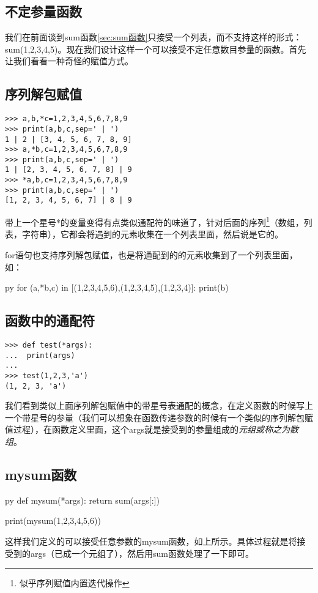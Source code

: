 \documentclass[12pt,oneside]{book}
\begin{document}
\begin{common-format}
\section{不定参量函数}
我们在前面谈到sum函数\ref{sec:sum函数}只接受一个列表，而不支持这样的形式：sum(1,2,3,4,5)。现在我们设计这样一个可以接受不定任意数目参量的函数。首先让我们看看一种奇怪的赋值方式。

\subsection{序列解包赋值}
\label{sec:序列解包赋值}
\begin{Verbatim}
>>> a,b,*c=1,2,3,4,5,6,7,8,9
>>> print(a,b,c,sep=' | ')
1 | 2 | [3, 4, 5, 6, 7, 8, 9]
>>> a,*b,c=1,2,3,4,5,6,7,8,9
>>> print(a,b,c,sep=' | ')
1 | [2, 3, 4, 5, 6, 7, 8] | 9
>>> *a,b,c=1,2,3,4,5,6,7,8,9
>>> print(a,b,c,sep=' | ')
[1, 2, 3, 4, 5, 6, 7] | 8 | 9
\end{Verbatim}
带上一个星号*的变量变得有点类似通配符的味道了，针对后面的序列\footnote{似乎序列赋值内置迭代操作}（数组，列表，字符串），它都会将遇到的元素收集在一个列表里面，然后说是它的。

for语句也支持序列解包赋值，也是将通配到的的元素收集到了一个列表里面，如：
\begin{xverbatim}[129]{py}
for (a,*b,c) in [(1,2,3,4,5,6),(1,2,3,4,5),(1,2,3,4)]:
    print(b)
\end{xverbatim}


\subsection{函数中的通配符}
\begin{Verbatim}
>>> def test(*args):
...  print(args)
... 
>>> test(1,2,3,'a')
(1, 2, 3, 'a')
\end{Verbatim}
我们看到类似上面序列解包赋值中的带星号表通配的概念，在定义函数的时候写上一个带星号的参量（我们可以想象在函数传递参数的时候有一个类似的序列解包赋值过程），在函数定义里面，这个args就是接受到的参量组成的\emph{元组或称之为数组}。


\subsection{mysum函数}
\begin{xverbatim}[129]{py}
def mysum(*args):
    return sum(args[:])

print(mysum(1,2,3,4,5,6))
\end{xverbatim}
这样我们定义的可以接受任意参数的mysum函数，如上所示。具体过程就是将接受到的args（已成一个元组了），然后用sum函数处理了一下即可。



\end{common-format}
\end{document}
